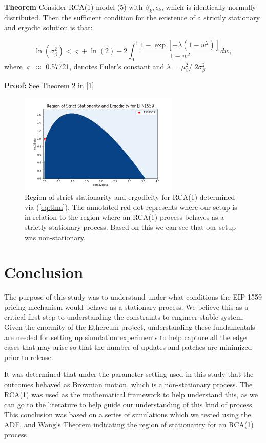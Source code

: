 \documentclass[peerreview]{ieeesyscoin}
\begin{document}
\textbf{Theorem} Consider RCA(1) model (5) with ${\beta_{k},\epsilon_{k}}$, which is identically normally distributed.  Then the sufficient condition for the existence of a strictly stationary and ergodic solution is that:

\begin{equation}
\ln(\sigma_{\beta}^2) < \varsigma + \ln(2) - 2 \int_{0}^{1}\frac{1 - \exp[-\lambda(1-w^2)]}{1-w^2}dw,
\label{eq:thm} \tag{8}
\end{equation}
where $\varsigma$ $\approx$ 0.57721, denotes Euler’s constant and $\lambda$ = $\mu_{\beta}^2$/ $2\sigma_{\beta}^2$

\textbf{Proof:} See Theorem 2 in [1]

\begin{figure}[h!]
\includegraphics[width=3in]{img/strict_stationarity.png}
\caption{Region of strict stationarity and ergodicity for RCA(1) determined via (\ref{eq:thm}). The annotated red dot represents where our setup is in relation to the region where an RCA(1) process behaves as a strictly stationary process. Based on this we can see that our setup was non-stationary.} 
\label{fig:strict_stationarity}
\end{figure} 

\section{Conclusion}
\label{section:conclusion}

The purpose of this study was to understand under what conditions the EIP 1559 pricing mechanism would behave as a stationary process. We believe this as a critical first step to understanding the constraints to engineer stable system. Given the enormity of the Ethereum project, understanding these fundamentals are needed for setting up simulation experiments to help capture all the edge cases that may arise so that the number of updates and patches are minimized prior to release.

It was determined that under the parameter setting used in this study that the outcomes behaved as Brownian motion, which is a non-stationary process. The RCA(1) was used as the mathematical framework to help understand this, as we can go to the literature to help guide our understanding of this kind of process. This conclusion was based on a series of simulations which we tested using the ADF, and Wang's Theorem indicating the region of stationarity for an RCA(1) process. 
\end{document}
